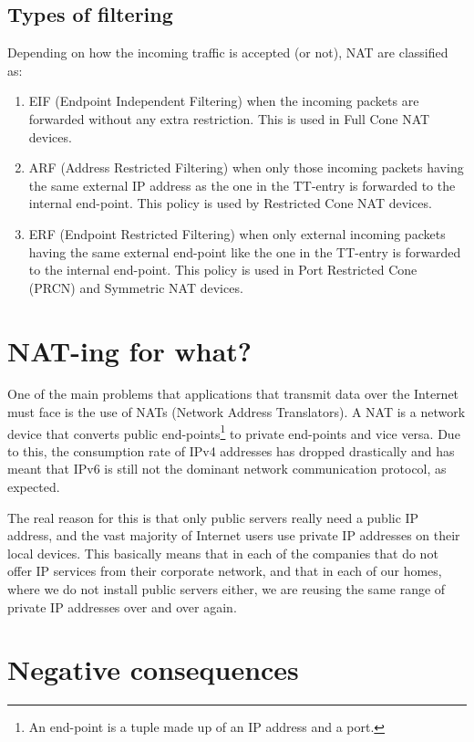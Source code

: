 \begin{enumrate}
\subsection{Types of filtering}

Depending on how the incoming traffic is accepted (or not), NAT are
classified as:

\begin{enumerate}
\item EIF (Endpoint Independent Filtering) when the incoming packets
  are forwarded without any extra restriction. This is used in Full
  Cone NAT devices.
\item ARF (Address Restricted Filtering) when only those incoming
  packets having the same external IP address as the one in the
  TT-entry is forwarded to the internal end-point. This policy is used
  by Restricted Cone NAT devices.
\item ERF (Endpoint Restricted Filtering) when only external incoming
  packets having the same external end-point like the one in
  the TT-entry is forwarded to the internal end-point. This policy is used in
  Port Restricted Cone (PRCN) and Symmetric NAT devices.
\end{enumerate}
  
\section{NAT-ing for what?}

One of the main problems that applications that transmit data over the
Internet must face is the use of NATs (Network Address Translators). A
NAT is a network device that converts public end-points\footnote{An
end-point is a tuple made up of an IP address and a port.} to private
end-points and vice versa. Due to this, the consumption rate of IPv4
addresses has dropped drastically and has meant that IPv6 is still not
the dominant network communication protocol, as expected.

The real reason for this is that only public servers really need a
public IP address, and the vast majority of Internet users use private
IP addresses on their local devices. This basically means that in each
of the companies that do not offer IP services from their corporate
network, and that in each of our homes, where we do not install public
servers either, we are reusing the same range of private IP addresses
over and over again.

\section{Negative consequences}


\end{enumrate}

